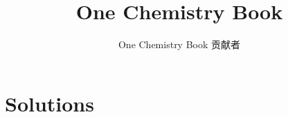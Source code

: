 \documentclass[11pt,a4paper,twoside,openany]{book}
\title{One Chemistry Book}
\author{One Chemistry Book 贡献者}
\date{\bookdate}
\begin{document}
\mainmatter
\setcounter{chapter}{2}

\appendix
\chapter{Solutions}

\end{document}
